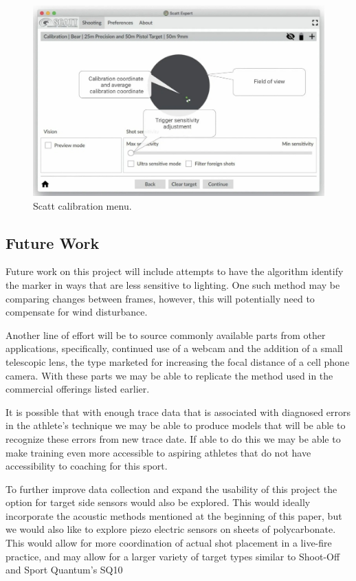 \documentclass[conference]{IEEEtran}
\begin{document}
\begin{figure}[]
	\centering
	\includegraphics[width=\linewidth]{scatt_calibration}
	\caption{Scatt \cite{scatt} calibration menu.}
	\label{fig:scatt_calibration}
\end{figure}


\subsection{Future Work}

Future work on this project will include attempts to have the algorithm identify the marker in ways that are less sensitive to lighting.
One such method may be comparing changes between frames,
however, this will potentially need to compensate for wind disturbance.

Another line of effort will be to source commonly available parts from other applications, specifically, continued use of a webcam and the addition of a small telescopic lens, the type marketed for increasing the focal distance of a cell phone camera.
With these parts we may be able to replicate the method used in the commercial offerings listed earlier.

It is possible that with enough trace data that is associated with diagnosed errors in the athlete's technique we may be able to produce models that will be able to recognize these errors from new trace date.
If able to do this we may be able to make training even more accessible to aspiring athletes that do not have accessibility to coaching for this sport.

To further improve data collection and expand the usability of this project the option for target side sensors would also be explored.
This would ideally incorporate the acoustic methods mentioned at the beginning of this paper, but we would also like to explore piezo electric sensors on sheets of polycarbonate.
This would allow for more coordination of actual shot placement in a live-fire practice, and may allow for a larger variety of target types similar to Shoot-Off \cite{shootoff} and Sport Quantum's SQ10 \cite{sportquantum}



\nocite{github}


\end{document}
